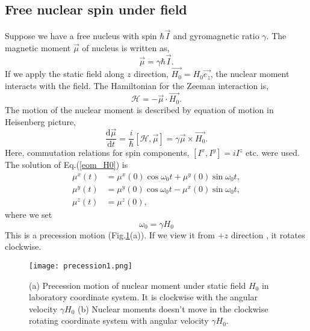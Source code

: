 \documentclass[a4,10.5pt]{report}
\begin{document}
\subsection{Free nuclear spin under field}
Suppose we have a free nucleus with spin $\hbar\vec{I}$ and gyromagnetic ratio $\gamma$.
The magnetic moment $\vec{\mu}$ of nucleus is written as,
\begin{equation}
\vec{\mu} = \gamma\hbar\vec{I}.
\end{equation}
If we apply the static field along $z$ direction, $\overrightarrow{H_0} = H_0\vec{e_z}$, the nuclear moment interacts with the field.
The Hamiltonian for the Zeeman interaction is,
\begin{equation}
\mathcal{H} = -\vec{\mu}\cdot\overrightarrow{H_0}.
\end{equation}
The motion of the nuclear moment is described by equation of motion in Heisenberg picture,
\begin{equation}
\frac{\mathrm{d}\vec{\mu}}{\mathrm{d}t} = \frac{i}{\hbar}[\mathcal{H},\vec{\mu}] = \gamma\vec{\mu}\times\overrightarrow{H_0}.
\label{eom_H0}
\end{equation}
Here, commutation relations for spin components, $[I^x, I^y] = iI^z$ etc. were used.
The solution of Eq.(\ref{eom_H0}) is 
\begin{align}
\mu^x (t) &= \mu^x(0)\cos\omega_0t + \mu^y(0)\sin\omega_0t,\\
\mu^y (t) &= \mu^y(0)\cos\omega_0t - \mu^x(0)\sin\omega_0t,\\
\mu^z (t) &= \mu^z(0),
\end{align}
where we set 
\begin{equation}
\omega_0 = \gamma H_0
\end{equation}
This is a precession motion (Fig.\ref{precession1}(a)). 
If we view it from $+z$ direction , it rotates clockwise. 

\begin{figure}
  \centering
  \texttt{[image: precession1.png]}
  \caption{(a) Precession motion of nuclear moment under static field $H_0$ in laboratory coordinate system.
  It is clockwise with the angular velocity $\gamma H_0$
  (b) Nuclear moments doesn't move in the clockwise rotating coordinate system with angular velocity $\gamma H_0$.}
  \label{precession1}
\end{figure}
\end{document}
